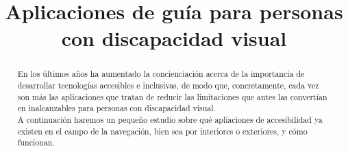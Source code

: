 \documentclass{article}
\title{\Huge Aplicaciones de guía para personas con discapacidad visual}
\begin{document}
	
	\begin{titlepage}
		\maketitle
		\thispagestyle{empty}
	\end{titlepage}
	
	\begin{abstract}
	    En los últimos años ha aumentado la concienciación acerca de la importancia de desarrollar tecnologías accesibles e inclusivas, de modo que, concretamente, cada vez son más las aplicaciones que tratan de reducir las limitaciones que antes las convertían en inalcanzables para personas con discapacidad visual.
	    \\
	    A continuación haremos un pequeño estudio sobre qué apliaciones de accesibilidad ya existen en el campo de la navegación, bien sea por interiores o exteriores, y cómo funcionan.
	
	\end{abstract}
	
\end{document}
